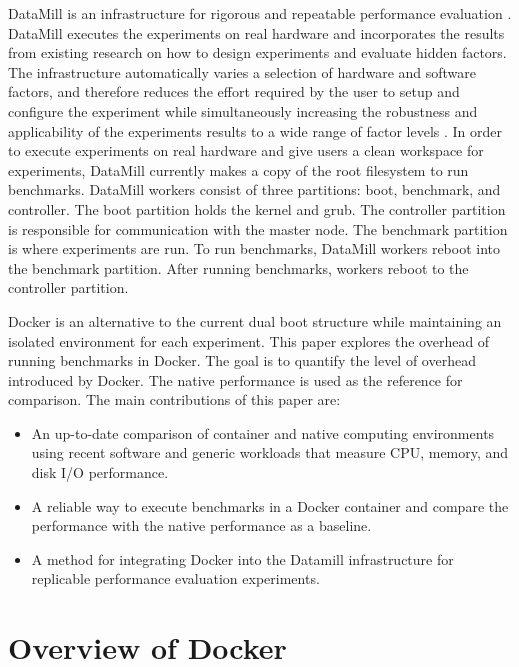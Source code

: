 \documentclass[11pt]{article}
\begin{document}
DataMill is an infrastructure for rigorous and repeatable performance evaluation \cite{augusto}. DataMill executes the experiments on real hardware and incorporates the results from existing research on how to design experiments and evaluate hidden factors. The infrastructure automatically varies a selection of hardware and software factors, and therefore reduces the effort required by the user to setup and configure the experiment while simultaneously increasing the robustness and applicability of the experiments results to a wide range of factor levels \cite{augusto}. In order to execute experiments on real hardware and give users a clean workspace for experiments, DataMill currently makes a copy of the root filesystem to run benchmarks. DataMill workers consist of three partitions: boot, benchmark, and controller. The boot partition holds the kernel and grub. The controller partition is responsible for communication with the master node. The benchmark partition is where experiments are run. To run benchmarks, DataMill workers reboot into the benchmark partition. After running benchmarks, workers reboot to the controller partition. 

Docker is an alternative to the current dual boot structure while maintaining an isolated environment for each experiment. This paper explores the overhead of running benchmarks in Docker. The goal is to quantify the level of overhead introduced by Docker. The native performance is used as the reference for comparison. The main contributions of this paper are:
\begin{itemize}
	\item An up-to-date comparison of container and native computing environments using recent software and generic workloads that measure CPU, memory, and disk I/O performance.
	\item A reliable way to execute benchmarks in a Docker container and compare the performance with the native performance as a baseline.
	\item A method for integrating Docker into the Datamill infrastructure for replicable performance evaluation experiments.
\end{itemize}

\section{Overview of Docker}
\end{document}
